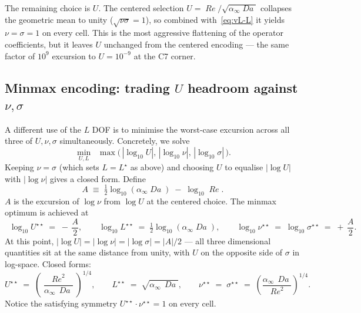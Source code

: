 \documentclass[11pt]{article}
\newcommand{\Reyn}{\operatorname{\mathit{Re}}}
\newcommand{\Damk}{\operatorname{\mathit{Da}}}
\begin{document}
The remaining choice is $U$. The centered selection
$U = \Reyn / \sqrt{\alpha_\infty \Damk}$ collapses the geometric mean to
unity ($\sqrt{\nu\sigma} = 1$), so combined with~\eqref{eq:vL-L} it
yields $\nu = \sigma = 1$ on every cell. This is the most aggressive
flattening of the operator coefficients, but it leaves $U$ unchanged
from the centered encoding — the same factor of $10^9$ excursion to
$U = 10^{-9}$ at the C7 corner.

\subsection{Minmax encoding: trading $U$ headroom against $\nu, \sigma$}

A different use of the $L$ DOF is to minimise the worst-case excursion
across all three of $U, \nu, \sigma$ simultaneously. Concretely, we
solve
\begin{equation}
  \min_{U, L}\;\; \max\!\bigl(\,|\log_{10} U|,\,|\log_{10} \nu|,\,|\log_{10} \sigma|\,\bigr).
\end{equation}
Keeping $\nu = \sigma$ (which sets $L = L^\star$ as above) and choosing
$U$ to equalise $|\log U|$ with $|\log \nu|$ gives a closed form. Define
\begin{equation}
  A \;\equiv\; \tfrac{1}{2}\log_{10}(\alpha_\infty \Damk) \;-\; \log_{10}\Reyn.
\end{equation}
$A$ is the excursion of $\log\nu$ from $\log U$ at the centered choice.
The minmax optimum is achieved at
\begin{equation}
  \boxed{\;\;
    \log_{10} U^{\star\star} \;=\; -\,\frac{A}{2},
    \qquad
    \log_{10} L^{\star\star} \;=\; \tfrac{1}{2}\log_{10}(\alpha_\infty \Damk),
    \qquad
    \log_{10}\nu^{\star\star} \;=\; \log_{10}\sigma^{\star\star} \;=\; +\,\frac{A}{2}.
  \;\;}
  \label{eq:vL-minmax}
\end{equation}
At this point, $|\log U| = |\log \nu| = |\log \sigma| = |A|/2$ — all
three dimensional quantities sit at the same distance from unity, with
$U$ on the opposite side of $\sigma$ in log-space. Closed forms:
\begin{equation}
  U^{\star\star} \;=\; \left(\frac{\Reyn^{2}}{\alpha_\infty\,\Damk}\right)^{1/4},
  \qquad
  L^{\star\star} \;=\; \sqrt{\alpha_\infty\,\Damk},
  \qquad
  \nu^{\star\star} \;=\; \sigma^{\star\star} \;=\; \left(\frac{\alpha_\infty\,\Damk}{\Reyn^{2}}\right)^{1/4}.
\end{equation}
Notice the satisfying symmetry $U^{\star\star} \cdot \nu^{\star\star} =
1$ on every cell.
\end{document}
